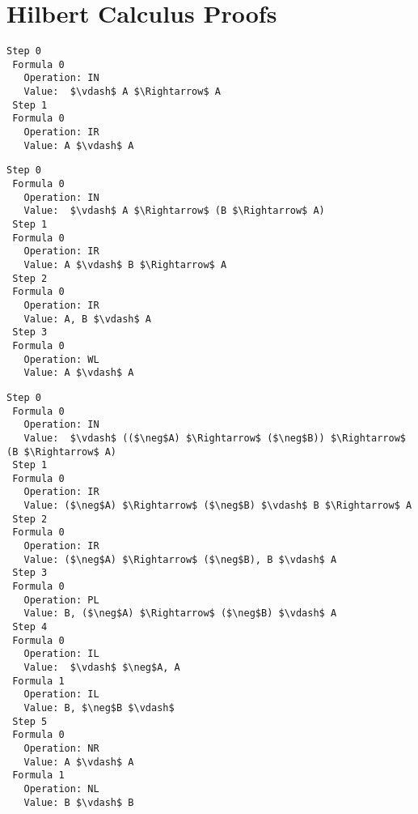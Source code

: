 \documentclass{article}
\begin{document}
\section{Hilbert Calculus Proofs}

\begin{lstlisting}[mathescape=true,title=Axiom 1 Proof]
 Step 0
 Formula 0
   Operation: IN
   Value:  $\vdash$ A $\Rightarrow$ A
 Step 1
 Formula 0
   Operation: IR
   Value: A $\vdash$ A
\end{lstlisting}

\begin{lstlisting}[mathescape=true,title=Axiom 2 Proof]
 Step 0
 Formula 0
   Operation: IN
   Value:  $\vdash$ A $\Rightarrow$ (B $\Rightarrow$ A)
 Step 1
 Formula 0
   Operation: IR
   Value: A $\vdash$ B $\Rightarrow$ A
 Step 2
 Formula 0
   Operation: IR
   Value: A, B $\vdash$ A
 Step 3
 Formula 0
   Operation: WL
   Value: A $\vdash$ A
\end{lstlisting}

\begin{lstlisting}[mathescape=true,title=Axiom 4 Proof]
 Step 0
 Formula 0
   Operation: IN
   Value:  $\vdash$ (($\neg$A) $\Rightarrow$ ($\neg$B)) $\Rightarrow$ (B $\Rightarrow$ A)
 Step 1
 Formula 0
   Operation: IR
   Value: ($\neg$A) $\Rightarrow$ ($\neg$B) $\vdash$ B $\Rightarrow$ A
 Step 2
 Formula 0
   Operation: IR
   Value: ($\neg$A) $\Rightarrow$ ($\neg$B), B $\vdash$ A
 Step 3
 Formula 0
   Operation: PL
   Value: B, ($\neg$A) $\Rightarrow$ ($\neg$B) $\vdash$ A
 Step 4
 Formula 0
   Operation: IL
   Value:  $\vdash$ $\neg$A, A
 Formula 1
   Operation: IL
   Value: B, $\neg$B $\vdash$ 
 Step 5
 Formula 0
   Operation: NR
   Value: A $\vdash$ A
 Formula 1
   Operation: NL
   Value: B $\vdash$ B
\end{lstlisting}
\end{document}
